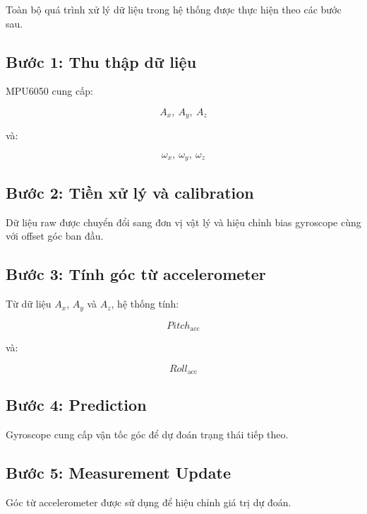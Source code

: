 \documentclass[a4paper,12pt]{report}
\begin{document}
Toàn bộ quá trình xử lý dữ liệu trong hệ thống được thực hiện theo các bước sau.

\subsection{Bước 1: Thu thập dữ liệu}

MPU6050 cung cấp:

\begin{equation}
A_x,\ A_y,\ A_z
\end{equation}

và:

\begin{equation}
\omega_x,\ \omega_y,\ \omega_z
\end{equation}

\subsection{Bước 2: Tiền xử lý và calibration}

Dữ liệu raw được chuyển đổi sang đơn vị vật lý và hiệu chỉnh bias gyroscope cùng với offset góc ban đầu.

\subsection{Bước 3: Tính góc từ accelerometer}

Từ dữ liệu $A_x$, $A_y$ và $A_z$, hệ thống tính:

\begin{equation}
Pitch_{\text{acc}}
\end{equation}

và:

\begin{equation}
Roll_{\text{acc}}
\end{equation}

\subsection{Bước 4: Prediction}

Gyroscope cung cấp vận tốc góc để dự đoán trạng thái tiếp theo.

\subsection{Bước 5: Measurement Update}

Góc từ accelerometer được sử dụng để hiệu chỉnh giá trị dự đoán.
\end{document}
